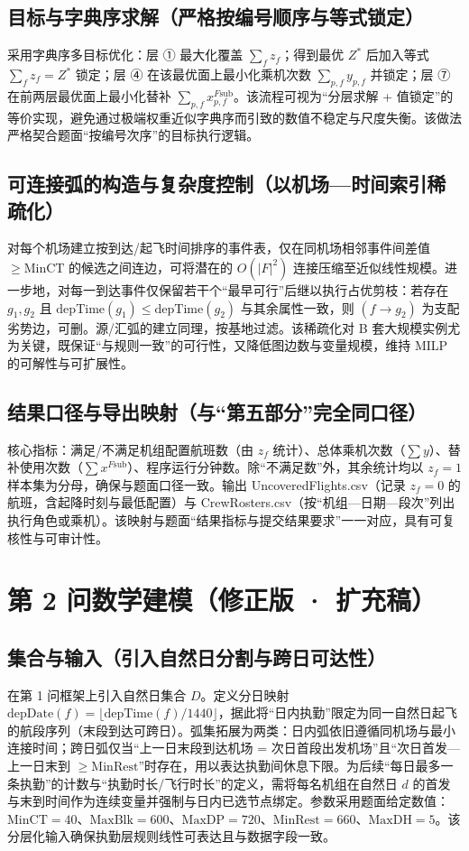 \documentclass{article}
\begin{document}
\subsection{目标与字典序求解（严格按编号顺序与等式锁定）}
采用字典序多目标优化：层 ① 最大化覆盖 $\sum_f z_f$；得到最优 $Z^*$ 后加入等式 $\sum_f z_f=Z^*$ 锁定；层 ④ 在该最优面上最小化乘机次数 $\sum_{p,f}y_{p,f}$ 并锁定；层 ⑦ 在前两层最优面上最小化替补 $\sum_{p,f}x^{F\text{sub}}_{p,f}$。该流程可视为“分层求解 + 值锁定”的等价实现，避免通过极端权重近似字典序而引致的数值不稳定与尺度失衡。该做法严格契合题面“按编号次序”的目标执行逻辑。

\subsection{可连接弧的构造与复杂度控制（以机场—时间索引稀疏化）}
对每个机场建立按到达/起飞时间排序的事件表，仅在同机场相邻事件间差值 $\ge \mathrm{MinCT}$ 的候选之间连边，可将潜在的 $O(|F|^2)$ 连接压缩至近似线性规模。进一步地，对每一到达事件仅保留若干个“最早可行”后继以执行占优剪枝：若存在 $g_1, g_2$ 且 $\mathrm{depTime}(g_1) \le \mathrm{depTime}(g_2)$ 与其余属性一致，则 $(f \to g_2)$ 为支配劣势边，可删。源/汇弧的建立同理，按基地过滤。该稀疏化对 B 套大规模实例尤为关键，既保证“与规则一致”的可行性，又降低图边数与变量规模，维持 MILP 的可解性与可扩展性。

\subsection{结果口径与导出映射（与“第五部分”完全同口径）}
核心指标：满足/不满足机组配置航班数（由 $z_f$ 统计）、总体乘机次数（$\sum y$）、替补使用次数（$\sum x^{F\text{sub}}$）、程序运行分钟数。除“不满足数”外，其余统计均以 $z_f=1$ 样本集为分母，确保与题面口径一致。输出 UncoveredFlights.csv（记录 $z_f=0$ 的航班，含起降时刻与最低配置）与 CrewRosters.csv（按“机组—日期—段次”列出执行角色或乘机）。该映射与题面“结果指标与提交结果要求”一一对应，具有可复核性与可审计性。

\newpage

\section*{第 2 问数学建模（修正版 · 扩充稿）}

\subsection{集合与输入（引入自然日分割与跨日可达性）}
在第 1 问框架上引入自然日集合 $D$。定义分日映射 $\mathrm{depDate}(f)=\lfloor \mathrm{depTime}(f)/1440\rfloor$，据此将“日内执勤”限定为同一自然日起飞的航段序列（末段到达可跨日）。弧集拓展为两类：日内弧依旧遵循同机场与最小连接时间；跨日弧仅当“上一日末段到达机场 = 次日首段出发机场”且“次日首发—上一日末到 $\ge \mathrm{MinRest}$”时存在，用以表达执勤间休息下限。为后续“每日最多一条执勤”的计数与“执勤时长/飞行时长”的定义，需将每名机组在自然日 $d$ 的首发与末到时间作为连续变量并强制与日内已选节点绑定。参数采用题面给定数值：$\mathrm{MinCT}=40$、$\mathrm{MaxBlk}=600$、$\mathrm{MaxDP}=720$、$\mathrm{MinRest}=660$、$\mathrm{MaxDH}=5$。该分层化输入确保执勤层规则线性可表达且与数据字段一致。
\end{document}
